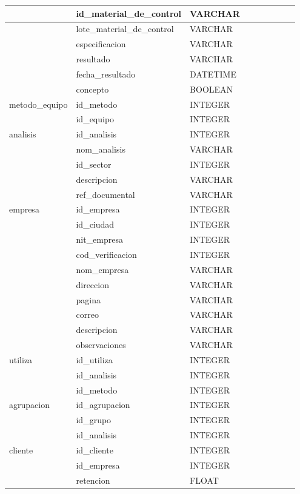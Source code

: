 \documentclass[letterpaper,10pt,spanish]{sphinxmanual}
\begin{document}
\begin{savenotes}
\begin{longtable}[c]{|l|l|l|l|l|l|l|l|l|}
\hline&
id\_material\_de\_control
&
VARCHAR
&&&&&&\\
\hline&
lote\_material\_de\_control
&
VARCHAR
&&&&&&\\
\hline&
especificacion
&
VARCHAR
&&&&&&\\
\hline&
resultado
&
VARCHAR
&&&&&&\\
\hline&
fecha\_resultado
&
DATETIME
&&&&&&\\
\hline&
concepto
&
BOOLEAN
&&&&&&\\
\hline
metodo\_equipo
&
id\_metodo
&
INTEGER
&&&&&&\\
\hline&
id\_equipo
&
INTEGER
&&&&&&\\
\hline
analisis
&
id\_analisis
&
INTEGER
&&&&&&\\
\hline&
nom\_analisis
&
VARCHAR
&&&&&&\\
\hline&
id\_sector
&
INTEGER
&&&&&&\\
\hline&
descripcion
&
VARCHAR
&&&&&&\\
\hline&
ref\_documental
&
VARCHAR
&&&&&&\\
\hline
empresa
&
id\_empresa
&
INTEGER
&&&&&&\\
\hline&
id\_ciudad
&
INTEGER
&&&&&&\\
\hline&
nit\_empresa
&
INTEGER
&&&&&&\\
\hline&
cod\_verificacion
&
INTEGER
&&&&&&\\
\hline&
nom\_empresa
&
VARCHAR
&&&&&&\\
\hline&
direccion
&
VARCHAR
&&&&&&\\
\hline&
pagina
&
VARCHAR
&&&&&&\\
\hline&
correo
&
VARCHAR
&&&&&&\\
\hline&
descripcion
&
VARCHAR
&&&&&&\\
\hline&
observaciones
&
VARCHAR
&&&&&&\\
\hline
utiliza
&
id\_utiliza
&
INTEGER
&&&&&&\\
\hline&
id\_analisis
&
INTEGER
&&&&&&\\
\hline&
id\_metodo
&
INTEGER
&&&&&&\\
\hline
agrupacion
&
id\_agrupacion
&
INTEGER
&&&&&&\\
\hline&
id\_grupo
&
INTEGER
&&&&&&\\
\hline&
id\_analisis
&
INTEGER
&&&&&&\\
\hline
cliente
&
id\_cliente
&
INTEGER
&&&&&&\\
\hline&
id\_empresa
&
INTEGER
&&&&&&\\
\hline&
retencion
&
FLOAT
&&&&&&\\

\end{longtable}
\end{savenotes}
\end{document}
